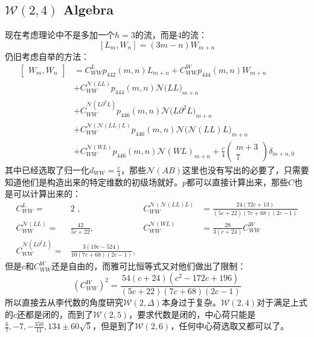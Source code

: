 \subsection{$\mathcal{W}(2,4)$ Algebra}
现在考虑理论中不是多加一个$h=3$的流，而是4的流：
\begin{equation}
	\left[L_m,W_n\right]=\left(3m-n\right)W_{m+n}
\end{equation}
仍旧考虑自举的方法：
\begin{equation}
	\begin{aligned}
		\left.\left[\begin{array}{c}W_{m},W_{n}\end{array}\right.\right]& =C_{WW}^{L}p_{442}(m,n)L_{m+n}+C_{WW}^{W}p_{444}(m,n)W_{m+n}  \\
		&+C_{WW}^{\mathcal{N}(LL)}p_{444}(m,n)\mathcal{N}\big(LL\big)_{m+n} \\
		&+C_{WW}^{\mathcal{N}(L\partial^{2}L)}p_{446}(m,n)\mathcal{N}\big(L\partial^{2}L\big)_{m+n} \\
		&+C_{WW}^{\mathcal{N}(\mathcal{N}(LL)L)}p_{446}(m,n)\mathcal{N}\big(\mathcal{N}(LL)L\big)_{m+n} \\
		&+C_{WW}^{\mathcal{N}(WL)}\left.p_{446}(m,n)\right.\mathcal{N}(WL)_{m+n}+\left.\frac c4\right.\begin{pmatrix}m+3\\7\end{pmatrix}\delta_{m+n,0}
	\end{aligned}
\end{equation}
其中已经选取了归一化$d_{WW}=\frac c4$，那些$\mathcal{N}(AB)$这里也没有写出的必要了，只需要知道他们是构造出来的特定维数的初级场就好。$p$都可以直接计算出来，那些$C$也是可以计算出来的：
\begin{equation}
	\begin{aligned}
		C_{WW}^{L}=& \text{2 ,}  &C_{WW}^{\mathcal{N}(\mathcal{N}(LL)L)}&=\frac{24\left(72c+13\right)}{\left(5c+22\right)\left(7c+68\right)\left(2c-1\right)}\\
		C_{WW}^{\mathcal N(LL)}=& \frac{42}{5c+22}, &C_{WW}^{\mathcal{N}(WL)}&=\frac{28}{3\left(c+24\right)}C_{WW}^{W} \\
		C_{WW}^{\mathcal{N}(L\partial^{2}L)} =&\frac{3\left(19c-524\right)}{10\left(7c+68\right)\left(2c-1\right)}, 
	\end{aligned}
\end{equation}
但是$c$和$C^W_{WW}$还是自由的，而雅可比恒等式又对他们做出了限制：
\begin{equation}
	\left(C_{WW}^W\right)^2=\frac{54\left(c+24\right)\left(c^2-172c+196\right)}{\left(5c+22\right)\left(7c+68\right)\left(2c-1\right)}
\end{equation}
所以直接去从李代数的角度研究$\mathcal{W}(2,\Delta)$本身过于复杂。$\mathcal{W}(2,4)$对于满足上式的$c$还都是闭的，而到了$\mathcal{W}(2,5)$，要求代数是闭的，中心荷只能是$\frac67,-7,-\frac{350}{11},134\pm60\sqrt{5}$，但是到了$\mathcal{W}(2,6)$，任何中心荷选取又都可以了。
